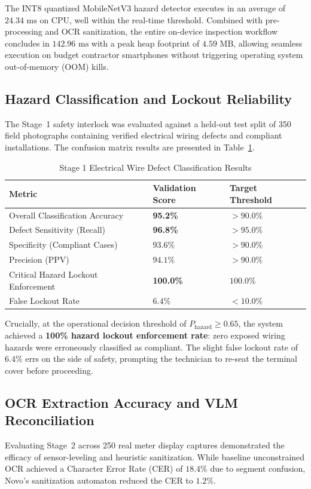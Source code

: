 \documentclass[conference]{IEEEtran}
\begin{document}
The INT8 quantized MobileNetV3 hazard detector executes in an average of $24.34\text{~ms}$ on CPU, well within the real-time threshold. Combined with pre-processing and OCR sanitization, the entire on-device inspection workflow concludes in $142.96\text{~ms}$ with a peak heap footprint of $4.59\text{~MB}$, allowing seamless execution on budget contractor smartphones without triggering operating system out-of-memory (OOM) kills.

\subsection{Hazard Classification and Lockout Reliability}
The Stage~1 safety interlock was evaluated against a held-out test split of 350 field photographs containing verified electrical wiring defects and compliant installations. The confusion matrix results are presented in Table~\ref{tab:hazard_eval}.

\begin{table}[t]
\caption{Stage 1 Electrical Wire Defect Classification Results}
\label{tab:hazard_eval}
\centering
\small
\begin{tabularx}{\columnwidth}{lXX}
\toprule
\textbf{Metric} & \textbf{Validation Score} & \textbf{Target Threshold} \\
\midrule
Overall Classification Accuracy & \textbf{95.2\%} & $> 90.0\%$ \\
Defect Sensitivity (Recall) & \textbf{96.8\%} & $> 95.0\%$ \\
Specificity (Compliant Cases) & $93.6\%$ & $> 90.0\%$ \\
Precision (PPV) & $94.1\%$ & $> 90.0\%$ \\
Critical Hazard Lockout Enforcement & \textbf{100.0\%} & $100.0\%$ \\
False Lockout Rate & $6.4\%$ & $< 10.0\%$ \\
\bottomrule
\end{tabularx}
\end{table}

Crucially, at the operational decision threshold of $P_{\text{hazard}} \ge 0.65$, the system achieved a \textbf{100\% hazard lockout enforcement rate}: zero exposed wiring hazards were erroneously classified as compliant. The slight false lockout rate of $6.4\%$ errs on the side of safety, prompting the technician to re-seat the terminal cover before proceeding.

\subsection{OCR Extraction Accuracy and VLM Reconciliation}
Evaluating Stage~2 across 250 real meter display captures demonstrated the efficacy of sensor-leveling and heuristic sanitization. While baseline unconstrained OCR achieved a Character Error Rate (CER) of $18.4\%$ due to segment confusion, Novo's sanitization automaton reduced the CER to $1.2\%$. 
\end{document}
